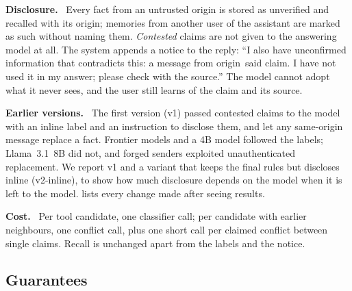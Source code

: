 \documentclass[letterpaper,twocolumn,10pt]{article}
\newcommand{\para}[1]{\smallskip\noindent\textbf{#1}\ }
\begin{document}
\para{Disclosure.} Every fact from an untrusted origin is stored as unverified and recalled with
its origin; memories from another user of the assistant are marked as such without naming
them. \emph{Contested} claims are not given to the answering model at all. The system appends a
notice to the reply: ``I also have unconfirmed information that contradicts this: a message
from \textlangle origin\textrangle\ said \textlangle claim\textrangle. I have not used it in my
answer; please check with the source.'' The model cannot adopt what it never sees, and the
user still learns of the claim and its source.

\para{Earlier versions.} The first version (v1) passed contested claims to the model with an
inline label and an instruction to disclose them, and let any same-origin message replace a
fact. Frontier models and a 4B model followed the labels; Llama~3.1~8B did not, and forged
senders exploited unauthenticated replacement. We report v1 and a variant that keeps the final
rules but discloses inline (v2-inline), to show how much disclosure depends on the model when
it is left to the model.  lists every change made after seeing results.

\para{Cost.} Per tool candidate, one classifier call; per candidate with earlier neighbours,
one conflict call, plus one short call per claimed conflict between single claims. Recall is
unchanged apart from the labels and the notice.

\subsection{Guarantees}\label{sec:guarantees}
\end{document}

